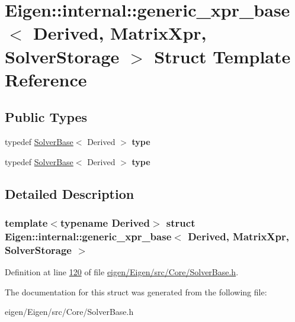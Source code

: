 \hypertarget{struct_eigen_1_1internal_1_1generic__xpr__base_3_01_derived_00_01_matrix_xpr_00_01_solver_storage_01_4}{}\section{Eigen\+:\+:internal\+:\+:generic\+\_\+xpr\+\_\+base$<$ Derived, Matrix\+Xpr, Solver\+Storage $>$ Struct Template Reference}
\label{struct_eigen_1_1internal_1_1generic__xpr__base_3_01_derived_00_01_matrix_xpr_00_01_solver_storage_01_4}
\subsection*{Public Types}
\begin{DoxyCompactItemize}
\item 
\mbox{\label{struct_eigen_1_1internal_1_1generic__xpr__base_3_01_derived_00_01_matrix_xpr_00_01_solver_storage_01_4_a5c1d5b4b360140ea61e91646bcee52c0}} 
typedef \hyperlink{class_eigen_1_1_solver_base}{Solver\+Base}$<$ Derived $>$ {\bfseries type}
\item 
\mbox{\label{struct_eigen_1_1internal_1_1generic__xpr__base_3_01_derived_00_01_matrix_xpr_00_01_solver_storage_01_4_a5c1d5b4b360140ea61e91646bcee52c0}} 
typedef \hyperlink{class_eigen_1_1_solver_base}{Solver\+Base}$<$ Derived $>$ {\bfseries type}
\end{DoxyCompactItemize}


\subsection{Detailed Description}
\subsubsection*{template$<$typename Derived$>$\newline
struct Eigen\+::internal\+::generic\+\_\+xpr\+\_\+base$<$ Derived, Matrix\+Xpr, Solver\+Storage $>$}



Definition at line \hyperlink{eigen_2_eigen_2src_2_core_2_solver_base_8h_source_l00120}{120} of file \hyperlink{eigen_2_eigen_2src_2_core_2_solver_base_8h_source}{eigen/\+Eigen/src/\+Core/\+Solver\+Base.\+h}.



The documentation for this struct was generated from the following file\+:\begin{DoxyCompactItemize}
\item 
eigen/\+Eigen/src/\+Core/\+Solver\+Base.\+h\end{DoxyCompactItemize}
